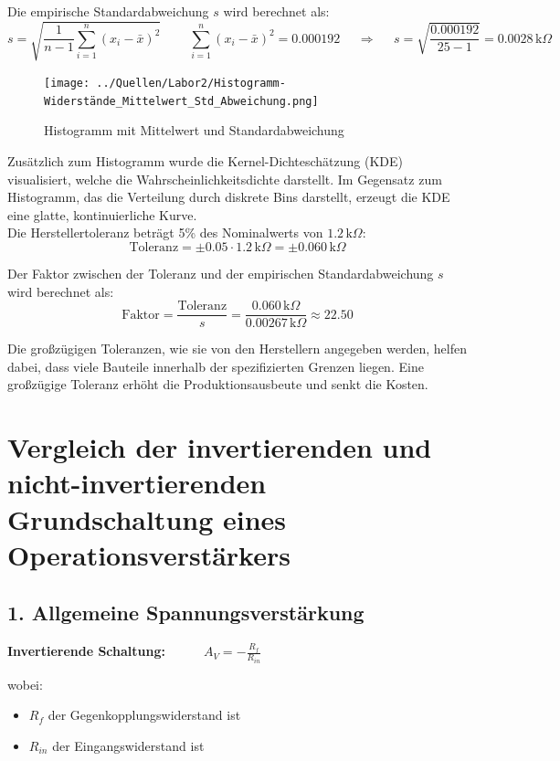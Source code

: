 \documentclass[a4paper,12pt]{article}
\begin{document}
Die empirische Standardabweichung \( s \) wird berechnet als:
\[
s = \sqrt{\frac{1}{n-1} \sum_{i=1}^{n} (x_i - \bar{x})^2}~~~~~~~~~~\sum_{i=1}^{n} (x_i - \bar{x})^2 = 0.000192~~~~~~\Rightarrow~~~~~~s = \sqrt{\frac{0.000192}{25 - 1}} = 0.0028 \, \text{k}\Omega
\]



\begin{figure}[H]
    \centering
    \texttt{[image: ../Quellen/Labor2/Histogramm-Widerstände\_Mittelwert\_Std\_Abweichung.png]}
\caption{Histogramm mit Mittelwert und Standardabweichung}
\end{figure}

\noindent Zusätzlich zum Histogramm wurde die Kernel-Dichteschätzung (KDE) visualisiert, welche die Wahrscheinlichkeitsdichte darstellt. Im Gegensatz zum Histogramm, das die Verteilung durch diskrete Bins darstellt, erzeugt die KDE eine glatte, kontinuierliche Kurve.\\

\noindent Die Herstellertoleranz beträgt 5\% des Nominalwerts von \( 1.2 \, \text{k}\Omega \):
\[
\text{Toleranz} = \pm 0.05 \cdot 1.2 \, \text{k}\Omega = \pm 0.060 \, \text{k}\Omega
\]

\noindent Der Faktor zwischen der Toleranz und der empirischen Standardabweichung \( s \) wird berechnet als:
\[
\text{Faktor} = \frac{\text{Toleranz}}{s} = \frac{0.060 \, \text{k}\Omega}{0.00267 \, \text{k}\Omega} \approx 22.50
\]

\noindent Die großzügigen Toleranzen, wie sie von den Herstellern angegeben werden, helfen dabei, dass viele Bauteile innerhalb der spezifizierten Grenzen liegen. Eine großzügige Toleranz erhöht die Produktionsausbeute und senkt die Kosten.


\section*{Vergleich der invertierenden und nicht-invertierenden Grundschaltung eines Operationsverstärkers}

\subsection*{1. Allgemeine Spannungsverstärkung}
\textbf{Invertierende Schaltung:}~~~~~~\(A_V = -\frac{R_f}{R_{in}}\)

\noindent wobei:
\begin{itemize}
    \item \( R_f \) der Gegenkopplungswiderstand ist
    \item \( R_{in} \) der Eingangswiderstand ist
\end{itemize}
\end{document}
